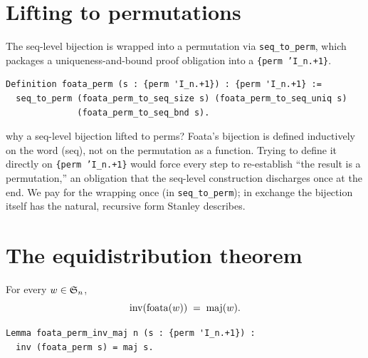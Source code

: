 \section{Lifting to permutations}

The seq-level bijection is wrapped into a permutation via
\texttt{seq\_to\_perm}, which packages a uniqueness-and-bound
proof obligation into a \texttt{\{perm 'I\_n.+1\}}.

\begin{lstlisting}[language=Rocq]
Definition foata_perm (s : {perm 'I_n.+1}) : {perm 'I_n.+1} :=
  seq_to_perm (foata_perm_to_seq_size s) (foata_perm_to_seq_uniq s)
              (foata_perm_to_seq_bnd s).
\end{lstlisting}


\begin{sidebar}{why a seq-level bijection lifted to perms?}
Foata's bijection is defined inductively on the word (seq), not on
the permutation as a function. Trying to define it directly on
\texttt{\{perm 'I\_n.+1\}} would force every step to re-establish
``the result is a permutation,'' an obligation that the seq-level
construction discharges once at the end. We pay for the wrapping
once (in \texttt{seq\_to\_perm}); in exchange the bijection itself
has the natural, recursive form Stanley describes.
\end{sidebar}

\section{The equidistribution theorem}

\begin{theorem}[$\inv(\mathrm{foata}\,w) = \maj(w)$]
  \label{thm:foata_perm_inv_maj}
  For every $w \in \mathfrak{S}_{n}$,
  \[
    \mathrm{inv}(\mathrm{foata}(w)) \;=\; \mathrm{maj}(w).
  \]
\end{theorem}

\begin{lstlisting}[language=Rocq]
Lemma foata_perm_inv_maj n (s : {perm 'I_n.+1}) :
  inv (foata_perm s) = maj s.
\end{lstlisting}

